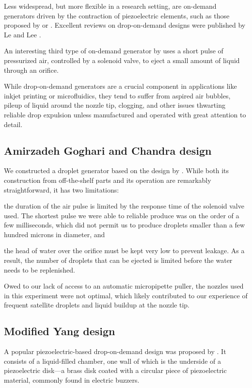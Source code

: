 \documentclass[11.5pt,oneside]{book}
\begin{document}
Less widespread, but more flexible in a research setting, are on-demand
generators driven by the contraction of piezoelectric elements, such as those
proposed by \citet{Yang97} or \citet{Ulmke99}. Excellent reviews on
drop-on-demand designs were published by Le and Lee \cite{Le98, Lee02}. 

An interesting third type of on-demand generator by \citet{Goghari08} uses a short
pulse of pressurized air, controlled by a solenoid valve, to eject a small
amount of liquid through an orifice.

While drop-on-demand generators are a crucial component in applications like inkjet
printing or microfluidics, they tend to suffer from aspired air bubbles, pileup
of liquid around the nozzle tip, clogging, and other issues thwarting reliable
drop expulsion unless manufactured and operated with great attention to detail.

\subsection{Amirzadeh Goghari and Chandra design}
We constructed a droplet generator based on the design by \citet{Goghari08}.
While both its construction from off-the-shelf parts and its operation are
remarkably straightforward, it has two limitations:

\begin{alist}
    \item the duration of the air pulse is limited by the response time of the
        solenoid valve used. The shortest pulse we were able to reliable produce
        was on the order of a few milliseconds, which did not permit us to
        produce droplets smaller than a few hundred microns in diameter, and
    \item the head of water over the orifice must be kept very low to prevent 
        leakage. As a result, the number of droplets that can be ejected is
        limited before the water needs to be replenished.
\end{alist}

Owed to our lack of access to an automatic micropipette puller, the nozzles used
in this experiment were not optimal, which likely contributed to our experience
of frequent satellite droplets and liquid buildup at the nozzle tip.

\subsection{Modified Yang design}
A popular piezoelectric-based drop-on-demand design was proposed by
\citet{Yang97}. It consists of a liquid-filled chamber, one wall of which is the
underside of a piezoelectric disk---a brass disk coated with a circular piece of
piezoelectric material, commonly found in electric buzzers.
\end{document}
